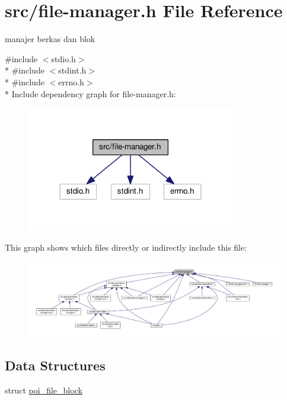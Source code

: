 \hypertarget{file-manager_8h}{\section{src/file-\/manager.h File Reference}
\label{file-manager_8h}
}


manajer berkas dan blok  


{\ttfamily \#include $<$stdio.\-h$>$}\\*
{\ttfamily \#include $<$stdint.\-h$>$}\\*
{\ttfamily \#include $<$errno.\-h$>$}\\*
Include dependency graph for file-\/manager.h\-:\nopagebreak
\begin{figure}[H]
\begin{center}
\leavevmode
\includegraphics[width=258pt]{file-manager_8h__incl}
\end{center}
\end{figure}
This graph shows which files directly or indirectly include this file\-:\nopagebreak
\begin{figure}[H]
\begin{center}
\leavevmode
\includegraphics[width=350pt]{file-manager_8h__dep__incl}
\end{center}
\end{figure}
\subsection*{Data Structures}
\begin{DoxyCompactItemize}
\item 
struct \hyperlink{structpoi__file__block}{poi\-\_\-file\-\_\-block}
\end{DoxyCompactItemize}
